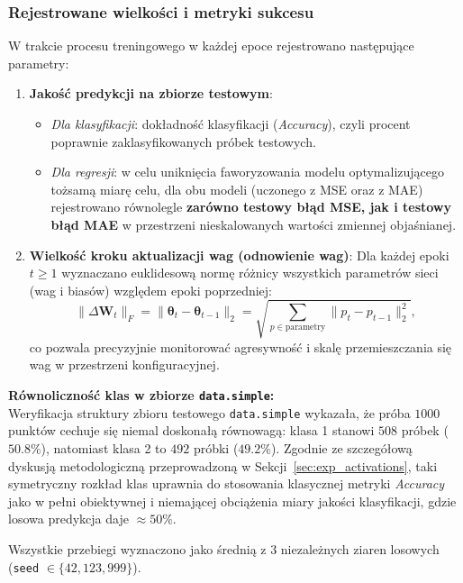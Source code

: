 \documentclass[11pt,a4paper]{article}
\begin{document}
\subsubsection{Rejestrowane wielkości i metryki sukcesu}
W trakcie procesu treningowego w każdej epoce rejestrowano następujące parametry:
\begin{enumerate}
    \item \textbf{Jakość predykcji na zbiorze testowym}:
    \begin{itemize}
        \item \emph{Dla klasyfikacji}: dokładność klasyfikacji (\emph{Accuracy}), czyli procent poprawnie zaklasyfikowanych próbek testowych.
        \item \emph{Dla regresji}: w celu uniknięcia faworyzowania modelu optymalizującego tożsamą miarę celu, dla obu modeli (uczonego z MSE oraz z MAE) rejestrowano równolegle \textbf{zarówno testowy błąd MSE, jak i testowy błąd MAE} w przestrzeni nieskalowanych wartości zmiennej objaśnianej.
    \end{itemize}
    \item \textbf{Wielkość kroku aktualizacji wag (odnowienie wag)}:
    Dla każdej epoki $t \ge 1$ wyznaczano euklidesową normę różnicy wszystkich parametrów sieci (wag i biasów) względem epoki poprzedniej:
    \begin{equation}
        \|\Delta \mathbf{W}_t\|_F = \|\mathbf{\theta}_t - \mathbf{\theta}_{t-1}\|_2 = \sqrt{\sum_{p \in \text{parametry}} \|p_t - p_{t-1}\|_2^2},
    \end{equation}
    co pozwala precyzyjnie monitorować agresywność i skalę przemieszczania się wag w przestrzeni konfiguracyjnej.
\end{enumerate}

\noindent\textbf{Równoliczność klas w zbiorze \texttt{data.simple}:}\\
Weryfikacja struktury zbioru testowego \texttt{data.simple} wykazała, że próba $1000$ punktów cechuje się niemal doskonałą równowagą: klasa 1 stanowi $508$ próbek ($50.8\%$), natomiast klasa 2 to $492$ próbki ($49.2\%$). Zgodnie ze szczegółową dyskusją metodologiczną przeprowadzoną w Sekcji~\ref{sec:exp_activations}, taki symetryczny rozkład klas uprawnia do stosowania klasycznej metryki \emph{Accuracy} jako w pełni obiektywnej i niemającej obciążenia miary jakości klasyfikacji, gdzie losowa predykcja daje $\approx 50\%$.

Wszystkie przebiegi wyznaczono jako średnią z $3$ niezależnych ziaren losowych (\texttt{seed} $\in \{42, 123, 999\}$).
\end{document}

